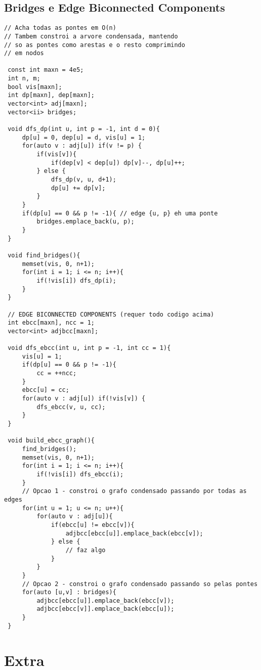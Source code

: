 \documentclass[11pt, a4paper, twoside]{article}
\begin{document}
\subsection{Bridges e Edge Biconnected Components}
\begin{lstlisting}
// Acha todas as pontes em O(n)
// Tambem constroi a arvore condensada, mantendo
// so as pontes como arestas e o resto comprimindo
// em nodos

 const int maxn = 4e5;
 int n, m;
 bool vis[maxn];
 int dp[maxn], dep[maxn];
 vector<int> adj[maxn];
 vector<ii> bridges;
 
 void dfs_dp(int u, int p = -1, int d = 0){
     dp[u] = 0, dep[u] = d, vis[u] = 1;
     for(auto v : adj[u]) if(v != p) {
         if(vis[v]){
             if(dep[v] < dep[u]) dp[v]--, dp[u]++;
         } else {
             dfs_dp(v, u, d+1);
             dp[u] += dp[v];
         }
     }
     if(dp[u] == 0 && p != -1){ // edge {u, p} eh uma ponte
         bridges.emplace_back(u, p);
     }
 }
 
 void find_bridges(){
     memset(vis, 0, n+1);
     for(int i = 1; i <= n; i++){
         if(!vis[i]) dfs_dp(i);
     }
 }
 
 // EDGE BICONNECTED COMPONENTS (requer todo codigo acima)
 int ebcc[maxn], ncc = 1;
 vector<int> adjbcc[maxn];
 
 void dfs_ebcc(int u, int p = -1, int cc = 1){
     vis[u] = 1;
     if(dp[u] == 0 && p != -1){
         cc = ++ncc;
     }
     ebcc[u] = cc;
     for(auto v : adj[u]) if(!vis[v]) {
         dfs_ebcc(v, u, cc);
     }
 }
 
 void build_ebcc_graph(){
     find_bridges();
     memset(vis, 0, n+1);
     for(int i = 1; i <= n; i++){
         if(!vis[i]) dfs_ebcc(i);
     }
     // Opcao 1 - constroi o grafo condensado passando por todas as edges
     for(int u = 1; u <= n; u++){
         for(auto v : adj[u]){
             if(ebcc[u] != ebcc[v]){
                 adjbcc[ebcc[u]].emplace_back(ebcc[v]);
             } else {
                 // faz algo
             }
         }
     }
     // Opcao 2 - constroi o grafo condensado passando so pelas pontes
     for(auto [u,v] : bridges){
         adjbcc[ebcc[u]].emplace_back(ebcc[v]);
         adjbcc[ebcc[v]].emplace_back(ebcc[u]);
     }
 }
\end{lstlisting}

\pagebreak


%
%

\section{Extra}
\end{document}
